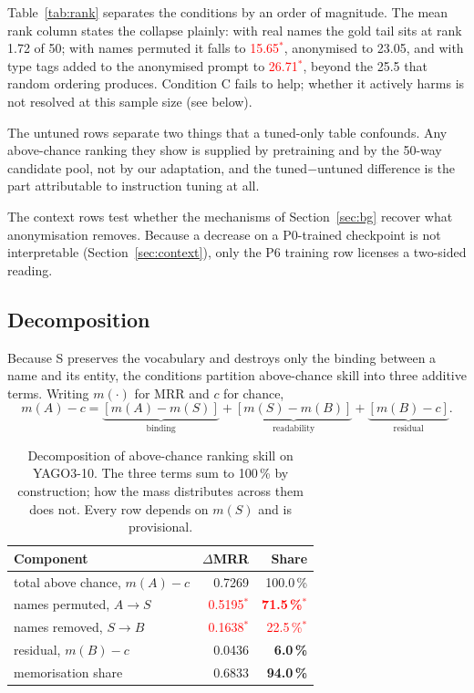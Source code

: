 \documentclass[conference]{IEEEtran}
\newcommand{\pv}[1]{\textcolor{red}{#1\ensuremath{^{\ast}}}}
\begin{document}
Table~\ref{tab:rank} separates the conditions by an order of magnitude. The mean
rank column states the collapse plainly: with real names the gold tail sits at
rank 1.72 of 50; with names permuted it falls to \pv{15.65}, anonymised to
23.05, and with type tags added to the anonymised prompt to \pv{26.71}, beyond
the 25.5 that random ordering produces. Condition C fails to help; whether it
actively harms is not resolved at this sample size (see below).

The untuned rows separate two things that a tuned-only table confounds. Any
above-chance ranking they show is supplied by pretraining and by the 50-way
candidate pool, not by our adaptation, and the tuned$-$untuned difference is the
part attributable to instruction tuning at all.

The context rows test whether the mechanisms of Section~\ref{sec:bg} recover
what anonymisation removes. Because a decrease on a P0-trained checkpoint is
not interpretable (Section~\ref{sec:context}), only the P6 training row licenses
a two-sided reading.

\subsection{Decomposition}
\label{sec:decomp}

Because S preserves the vocabulary and destroys only the binding between a name
and its entity, the conditions partition above-chance skill into three additive
terms. Writing $m(\cdot)$ for MRR and $c$ for chance,
\begin{equation}
m(A)-c = \underbrace{[m(A)-m(S)]}_{\text{binding}}
       + \underbrace{[m(S)-m(B)]}_{\text{readability}}
       + \underbrace{[m(B)-c]}_{\text{residual}} .
\end{equation}

\begin{table}[t]
\caption{Decomposition of above-chance ranking skill on YAGO3-10. The three
terms sum to 100\,\% by construction; how the mass distributes across them does
not. Every row depends on $m(S)$ and is provisional.}
\label{tab:decomp}
\centering
\footnotesize
\begin{tabular}{@{}lrr@{}}
\toprule
\textbf{Component} & \textbf{$\Delta$MRR} & \textbf{Share} \\
\midrule
total above chance, $m(A)-c$        & 0.7269 & 100.0\,\% \\
\midrule
names permuted, $A\!\to\!S$         & \pv{0.5195} & \pv{\textbf{71.5\,\%}} \\
names removed, $S\!\to\!B$          & \pv{0.1638} & \pv{22.5\,\%} \\
residual, $m(B)-c$                  & 0.0436 & \textbf{6.0\,\%} \\
\midrule
memorisation share                  & 0.6833 & \textbf{94.0\,\%} \\
\bottomrule
\end{tabular}
\end{table}
\end{document}

